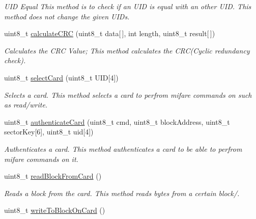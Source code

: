 \begin{DoxyCompactItemize}
\begin{DoxyCompactList}\small\item\em U\+ID Equal  This method is to check if an U\+ID is equal with an other U\+ID. This method does not change the given U\+ID\textquotesingle{}s. \end{DoxyCompactList}\item 
uint8\+\_\+t \hyperlink{classMFRC522_af63a4a15c8752ca8d032ffe2a1120370}{calculate\+C\+RC} (uint8\+\_\+t data\mbox{[}$\,$\mbox{]}, int length, uint8\+\_\+t result\mbox{[}$\,$\mbox{]})
\begin{DoxyCompactList}\small\item\em Calculates the C\+RC Value;  This method calculates the C\+R\+C(\+Cyclic redundancy check). \end{DoxyCompactList}\item 
uint8\+\_\+t \hyperlink{classMFRC522_a56c6f916603d82af034eb13362925670}{select\+Card} (uint8\+\_\+t U\+ID\mbox{[}4\mbox{]})
\begin{DoxyCompactList}\small\item\em Selects a card.  This method selects a card to perfrom mifare commands on such as read/write. \end{DoxyCompactList}\item 
uint8\+\_\+t \hyperlink{classMFRC522_ab7fae1cf241dd6c71589e42ebf4e7c9b}{authenticate\+Card} (uint8\+\_\+t cmd, uint8\+\_\+t block\+Address, uint8\+\_\+t sector\+Key\mbox{[}6\mbox{]}, uint8\+\_\+t uid\mbox{[}4\mbox{]})
\begin{DoxyCompactList}\small\item\em Authenticates a card.  This method authenticates a card to be able to perfrom mifare commands on it. \end{DoxyCompactList}\item 
\mbox{\label{classMFRC522_aca224c0db02bf77eee41999b5eba4d34}} 
uint8\+\_\+t \hyperlink{classMFRC522_aca224c0db02bf77eee41999b5eba4d34}{read\+Block\+From\+Card} ()
\begin{DoxyCompactList}\small\item\em Reads a block from the card.  This method reads bytes from a certain block/. \end{DoxyCompactList}\item 
\mbox{\label{classMFRC522_aa68abd0ac2fed0cd35e33da3d3bdefb6}} 
uint8\+\_\+t \hyperlink{classMFRC522_aa68abd0ac2fed0cd35e33da3d3bdefb6}{write\+To\+Block\+On\+Card} ()

\end{DoxyCompactItemize}
